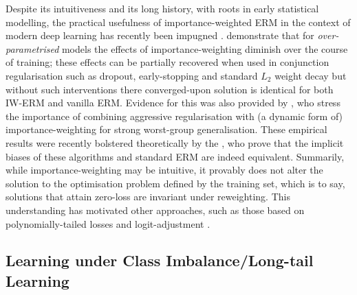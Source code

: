 Despite its intuitiveness and its long history, with roots in early statistical modelling, the
practical usefulness of importance-weighted ERM in the context of modern deep learning has recently
been impugned \citep{byrd2019effect, zhai2022understanding}.
%
\cite{byrd2019effect} demonstrate that for \emph{over-parametrised} models the effects of
importance-weighting diminish over the course of training; these effects can be partially recovered
when used in conjunction regularisation such as dropout, early-stopping and standard \(L_2\) weight
decay but without such interventions there converged-upon solution is identical for both IW-ERM and
vanilla ERM. 
%
Evidence for this was also provided by \cite{sagawa2019distributionally}, who stress the importance
of combining aggressive regularisation with (a dynamic form of) importance-weighting for
strong worst-group generalisation.
%
These empirical results were recently bolstered theoretically by the \cite{zhai2022understanding},
who prove that the implicit biases of these algorithms and standard ERM are indeed equivalent.
%
Summarily, while importance-weighting may be intuitive, it provably does not alter the solution to
the optimisation problem defined by the training set, which is to say, solutions that attain
zero-loss are invariant under reweighting.
%
This understanding has motivated other approaches, such as those based on polynomially-tailed
losses \citep{wang2021importance} and logit-adjustment \citep{menon2020long}.
%

\subsection{Learning under Class Imbalance/Long-tail Learning}

